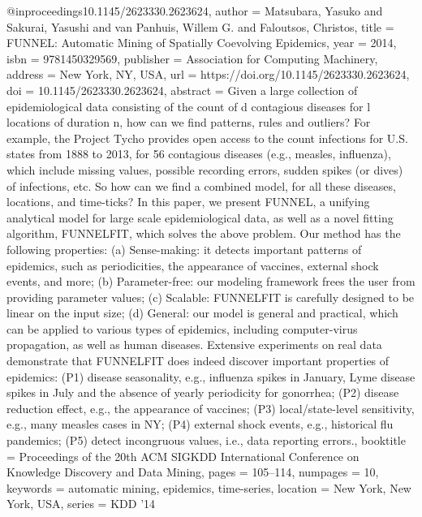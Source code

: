 @inproceedings{10.1145/2623330.2623624,
author = {Matsubara, Yasuko and Sakurai, Yasushi and van Panhuis, Willem G. and Faloutsos, Christos},
title = {FUNNEL: Automatic Mining of Spatially Coevolving Epidemics},
year = {2014},
isbn = {9781450329569},
publisher = {Association for Computing Machinery},
address = {New York, NY, USA},
url = {https://doi.org/10.1145/2623330.2623624},
doi = {10.1145/2623330.2623624},
abstract = {Given a large collection of epidemiological data consisting of the count of d contagious diseases for l locations of duration n, how can we find patterns, rules and outliers? For example, the Project Tycho provides open access to the count infections for U.S. states from 1888 to 2013, for 56 contagious diseases (e.g., measles, influenza), which include missing values, possible recording errors, sudden spikes (or dives) of infections, etc. So how can we find a combined model, for all these diseases, locations, and time-ticks? In this paper, we present FUNNEL, a unifying analytical model for large scale epidemiological data, as well as a novel fitting algorithm, FUNNELFIT, which solves the above problem. Our method has the following properties: (a) Sense-making: it detects important patterns of epidemics, such as periodicities, the appearance of vaccines, external shock events, and more; (b) Parameter-free: our modeling framework frees the user from providing parameter values; (c) Scalable: FUNNELFIT is carefully designed to be linear on the input size; (d) General: our model is general and practical, which can be applied to various types of epidemics, including computer-virus propagation, as well as human diseases. Extensive experiments on real data demonstrate that FUNNELFIT does indeed discover important properties of epidemics: (P1) disease seasonality, e.g., influenza spikes in January, Lyme disease spikes in July and the absence of yearly periodicity for gonorrhea; (P2) disease reduction effect, e.g., the appearance of vaccines; (P3) local/state-level sensitivity, e.g., many measles cases in NY; (P4) external shock events, e.g., historical flu pandemics; (P5) detect incongruous values, i.e., data reporting errors.},
booktitle = {Proceedings of the 20th ACM SIGKDD International Conference on Knowledge Discovery and Data Mining},
pages = {105–114},
numpages = {10},
keywords = {automatic mining, epidemics, time-series},
location = {New York, New York, USA},
series = {KDD '14}
}